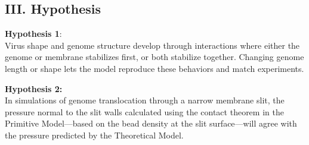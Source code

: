 \documentclass[12pt]{article}
\begin{document}
\begin{flushleft}

\subsection*{III. Hypothesis}

\noindent \textbf{Hypothesis 1}:\\
Virus shape and genome structure develop through interactions where either the genome or membrane stabilizes first, or both stabilize together. Changing genome length or shape lets the model reproduce these behaviors and match experiments.
	
\noindent \textbf{Hypothesis 2:}\\
In simulations of genome translocation through a narrow membrane slit, the pressure normal to the slit walls calculated using the contact theorem in the Primitive Model—based on the bead density at the slit surface—will agree with the pressure predicted by the Theoretical Model.


\end{flushleft}
\end{document}
